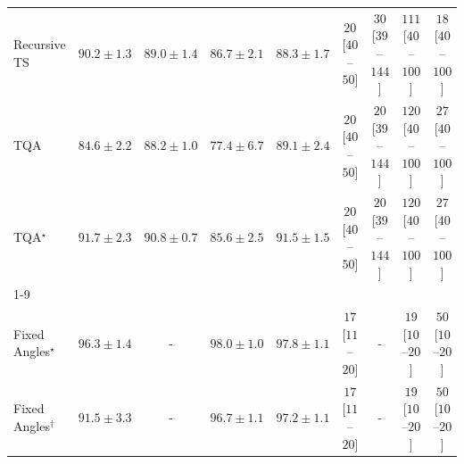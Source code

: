 \begin{tabular}{l|cccc|cccc|}
Recursive TS & {\cellcolor[HTML]{0C723B}} \color[HTML]{F1F1F1} $90.2\pm 1.3$ & {\cellcolor[HTML]{13773D}} \color[HTML]{F1F1F1} $89.0\pm 1.4$ & {\cellcolor[HTML]{218242}} \color[HTML]{F1F1F1} $86.7\pm 2.1$ & {\cellcolor[HTML]{177B3F}} \color[HTML]{F1F1F1} $88.3\pm 1.7$ & {\cellcolor[HTML]{FFF4F0}} \color[HTML]{000000} $20$ [$40$--$50$] & {\cellcolor[HTML]{FFF2EE}} \color[HTML]{000000} $30$ [$39$--$144$] & {\cellcolor[HTML]{FDDEDB}} \color[HTML]{000000} $111$ [$40$--$100$] & {\cellcolor[HTML]{FFF5F1}} \color[HTML]{000000} $18$ [$40$--$100$] \\
TQA & {\cellcolor[HTML]{2D914B}} \color[HTML]{F1F1F1} $84.6\pm 2.2$ & {\cellcolor[HTML]{187B3F}} \color[HTML]{F1F1F1} $88.2\pm 1.0$ & {\cellcolor[HTML]{61BB6D}} \color[HTML]{F1F1F1} $77.4\pm 6.7$ & {\cellcolor[HTML]{13773D}} \color[HTML]{F1F1F1} $89.1\pm 2.4$ & {\cellcolor[HTML]{FFF4F0}} \color[HTML]{000000} $20$ [$40$--$50$] & {\cellcolor[HTML]{FFF4F0}} \color[HTML]{000000} $20$ [$39$--$144$] & {\cellcolor[HTML]{FDDCD8}} \color[HTML]{000000} $120$ [$40$--$100$] & {\cellcolor[HTML]{FFF3EF}} \color[HTML]{000000} $27$ [$40$--$100$] \\
TQA$^\star$ & {\cellcolor[HTML]{026A38}} \color[HTML]{F1F1F1} $91.7\pm 2.3$ & {\cellcolor[HTML]{086E3A}} \color[HTML]{F1F1F1} $90.8\pm 0.7$ & {\cellcolor[HTML]{278946}} \color[HTML]{F1F1F1} $85.6\pm 2.5$ & {\cellcolor[HTML]{056C39}} \color[HTML]{F1F1F1} $91.5\pm 1.5$ & {\cellcolor[HTML]{FFF4F0}} \color[HTML]{000000} $20$ [$40$--$50$] & {\cellcolor[HTML]{FFF4F0}} \color[HTML]{000000} $20$ [$39$--$144$] & {\cellcolor[HTML]{FDDCD8}} \color[HTML]{000000} $120$ [$40$--$100$] & {\cellcolor[HTML]{FFF3EF}} \color[HTML]{000000} $27$ [$40$--$100$] \\
\cline{1-9}
\multicolumn{9}{c}{\rule{0pt}{8pt}SV} \\
\midrule
Fixed Angles$^\star$ & {\cellcolor[HTML]{034267}} \color[HTML]{F1F1F1} $96.3\pm 1.4$ & {\cellcolor[HTML]{000000}} \color[HTML]{F1F1F1} {\cellcolor{white}} \color{black} - & {\cellcolor[HTML]{023858}} \color[HTML]{F1F1F1} $98.0\pm 1.0$ & {\cellcolor[HTML]{02395A}} \color[HTML]{F1F1F1} $97.8\pm 1.1$ & {\cellcolor[HTML]{FFF5F1}} \color[HTML]{000000} $17$ [$11$--$20$] & {\cellcolor[HTML]{000000}} \color[HTML]{F1F1F1} {\cellcolor{white}} \color{black} - & {\cellcolor[HTML]{FFF5F1}} \color[HTML]{000000} $19$ [$10$--$20$] & {\cellcolor[HTML]{FEEDE9}} \color[HTML]{000000} $50$ [$10$--$20$] \\
Fixed Angles$^\dagger$ & {\cellcolor[HTML]{045D92}} \color[HTML]{F1F1F1} $91.5\pm 3.3$ & {\cellcolor[HTML]{000000}} \color[HTML]{F1F1F1} {\cellcolor{white}} \color{black} - & {\cellcolor[HTML]{023F64}} \color[HTML]{F1F1F1} $96.7\pm 1.1$ & {\cellcolor[HTML]{023C5F}} \color[HTML]{F1F1F1} $97.2\pm 1.1$ & {\cellcolor[HTML]{FFF5F1}} \color[HTML]{000000} $17$ [$11$--$20$] & {\cellcolor[HTML]{000000}} \color[HTML]{F1F1F1} {\cellcolor{white}} \color{black} - & {\cellcolor[HTML]{FFF5F1}} \color[HTML]{000000} $19$ [$10$--$20$] & {\cellcolor[HTML]{FEEDE9}} \color[HTML]{000000} $50$ [$10$--$20$] \\

\end{tabular}
